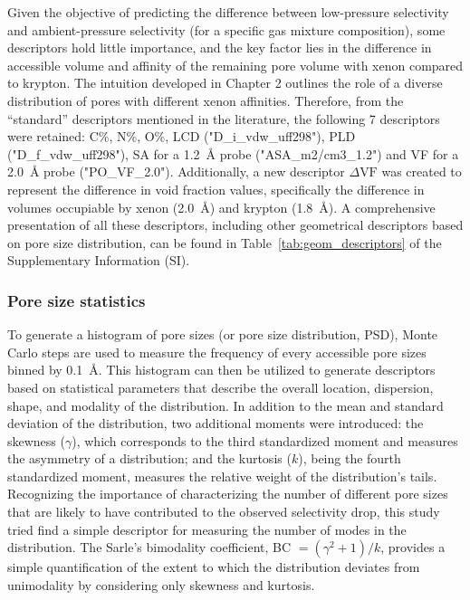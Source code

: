 \documentclass[main]{subfiles}
\begin{document}
Given the objective of predicting the difference between low-pressure selectivity and ambient-pressure selectivity (for a specific gas mixture composition), some descriptors hold little importance, and the key factor lies in the difference in accessible volume and affinity of the remaining pore volume with xenon compared to krypton. The intuition developed in Chapter 2 outlines the role of a diverse distribution of pores with different xenon affinities. Therefore, from the ``standard'' descriptors mentioned in the literature, the following 7 descriptors were retained: C\%, N\%, O\%, LCD ("D\_i\_vdw\_uff298"), PLD ("D\_f\_vdw\_uff298"), SA for a \SI{1.2}{\angstrom} probe ("ASA\_m2/cm3\_1.2") and VF for a \SI{2.0}{\angstrom} probe ("PO\_VF\_2.0"). Additionally, a new descriptor $\Delta \text{VF}$ was created to represent the difference in void fraction values, specifically the difference in volumes occupiable by xenon (\SI{2.0}{\angstrom}) and krypton (\SI{1.8}{\angstrom}). A comprehensive presentation of all these descriptors, including other geometrical descriptors based on pore size distribution, can be found in Table~\ref{tab:geom_descriptors} of the Supplementary Information (SI).

\subsubsection{Pore size statistics}

To generate a histogram of pore sizes (or pore size distribution, PSD), Monte Carlo steps are used to measure the frequency of every accessible pore sizes binned by \SI{0.1}{\angstrom}.\autocite{poresize_Pinheiro2013} This histogram can then be utilized to generate descriptors based on statistical parameters that describe the overall location, dispersion, shape, and modality of the distribution. In addition to the mean and standard deviation of the distribution, two additional moments were introduced: the skewness ($\gamma$), which corresponds to the third standardized moment and measures the asymmetry of a distribution; and the kurtosis ($k$), being the fourth standardized moment, measures the relative weight of the distribution's tails. Recognizing the importance of characterizing the number of different pore sizes that are likely to have contributed to the observed selectivity drop, this study tried find a simple descriptor for measuring the number of modes in the distribution. The Sarle's bimodality coefficient, BC $= (\gamma^2 +1)/k$, provides a simple quantification of the extent to which the distribution deviates from unimodality by considering only skewness and kurtosis\autocite{Tarba_2022}.
\end{document}
